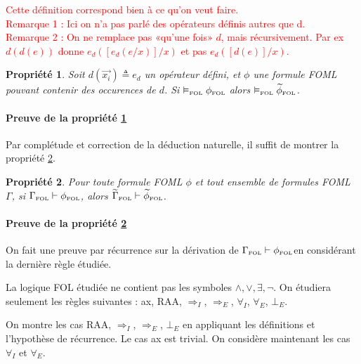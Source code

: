 \documentclass[12pt]{article}
\newcommand{\FOL}{\ensuremath{\textup{\tiny{}FOL}}}
\newcommand{\raph}[1]{\textcolor{red}{#1}}
\newtheorem{prop}{Propriété}
\begin{document}
\raph{%
  Cette définition correspond bien à ce qu'on veut faire.\\
  Remarque 1 : Ici on n'a pas parlé des opérateurs définis autres que d.\\
  Remarque 2 : On ne remplace pas «qu'une fois» $d$, mais récursivement.
  Par ex $d(d(e))$ donne $e_d([e_d(e/x)]/x)$ et pas $e_d([d(e)]/x)$.}


\begin{prop}
  \label{prop-sem}
Soit $d(\vec{x_i}) \triangleq e_d$ un opérateur défini, et $\phi$ une formule FOML pouvant contenir des occurences de $d$.
Si $\vDash_\FOL \phi_\FOL$ alors $\vDash_\FOL \widetilde{\phi}_\FOL$.
\end{prop}

\paragraph{Preuve de la propriété \ref{prop-sem}}
Par complétude et correction de la déduction naturelle, il suffit de montrer la propriété \ref{prop-syn}.

\begin{prop}
  \label{prop-syn}
  Pour toute formule FOML $\phi$ et tout ensemble de formules FOML $\Gamma$,
  si $\Gamma_\FOL \vdash \phi_\FOL$, alors $\widetilde{\Gamma}_\FOL \vdash \widetilde{\phi}_\FOL$.
\end{prop}

\paragraph{Preuve de la propriété \ref{prop-syn}}
On fait une preuve par récurrence sur la dérivation de $\Gamma_\FOL \vdash \phi_\FOL$en considérant la dernière règle étudiée.

La logique FOL étudiée ne contient pas les symboles $\land, \lor, \exists, \neg$.
On étudiera seulement les règles suivantes : ax, RAA, $\Rightarrow_I$, $\Rightarrow_E$, $\forall_I$, $\forall_E$, $\bot_E$.

On montre les cas RAA, $\Rightarrow_I$, $\Rightarrow_E$, $\bot_E$ en appliquant les définitions et l'hypothèse de récurrence.
Le cas ax est trivial.
On considère maintenant les cas $\forall_I$ et $\forall_E$.
\end{document}
